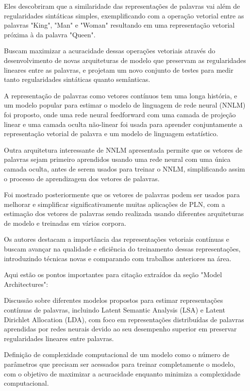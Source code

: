 Eles descobriram que a similaridade das representações de palavras vai além de regularidades sintáticas simples, exemplificando com a operação vetorial entre as palavras "King", "Man" e "Woman" resultando em uma representação vetorial próxima à da palavra "Queen".

Buscam maximizar a acuracidade dessas operações vetoriais através do desenvolvimento de novas arquiteturas de modelo que preservam as regularidades lineares entre as palavras, e projetam um novo conjunto de testes para medir tanto regularidades sintáticas quanto semânticas.

A representação de palavras como vetores contínuos tem uma longa história, e um modelo popular para estimar o modelo de linguagem de rede neural (NNLM) foi proposto, onde uma rede neural feedforward com uma camada de projeção linear e uma camada oculta não-linear foi usada para aprender conjuntamente a representação vetorial de palavra e um modelo de linguagem estatístico.

Outra arquitetura interessante de NNLM apresentada permite que os vetores de palavras sejam primeiro aprendidos usando uma rede neural com uma única camada oculta, antes de serem usados para treinar o NNLM, simplificando assim o processo de aprendizagem dos vetores de palavras.

Foi mostrado posteriormente que os vetores de palavras podem ser usados para melhorar e simplificar significativamente muitas aplicações de PLN, com a estimação dos vetores de palavras sendo realizada usando diferentes arquiteturas de modelo e treinadas em vários corpora.

Os autores destacam a importância das representações vetoriais contínuas e buscam avançar na qualidade e eficiência do treinamento dessas representações, introduzindo técnicas novas e comparando com trabalhos anteriores na área.

Aqui estão os pontos importantes para citação extraídos da seção "Model Architectures":

Discussão sobre diferentes modelos propostos para estimar representações contínuas de palavras, incluindo Latent Semantic Analysis (LSA) e Latent Dirichlet Allocation (LDA), com foco em representações distribuídas de palavras aprendidas por redes neurais devido ao seu desempenho superior em preservar regularidades lineares entre palavras.

Definição de complexidade computacional de um modelo como o número de parâmetros que precisam ser acessados para treinar completamente o modelo, com o objetivo de maximizar a acuracidade enquanto minimiza a complexidade computacional.

